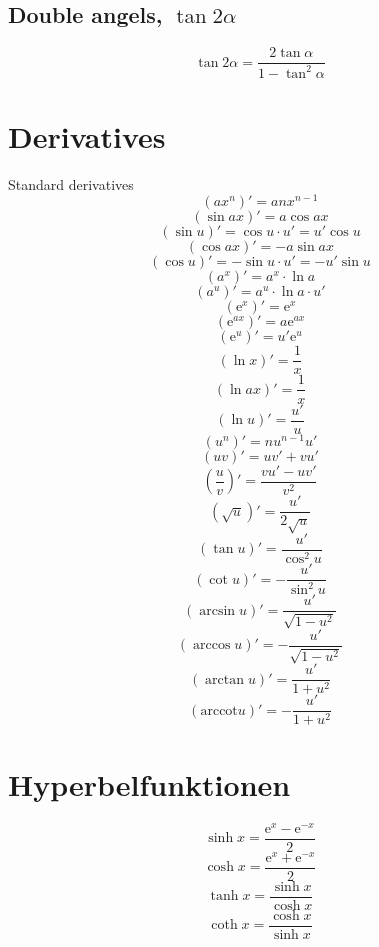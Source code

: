\documentclass[a4paper, 10pt]{scrartcl}
\newcommand*\euler{\mathrm{e}}
\newcommand*\arccot{\mathrm{arccot}}
\begin{document}
\subsection{Double angels, $\tan{2\alpha}$}
\[\tan{2\alpha} = \frac{2\tan{\alpha}}{1 - \tan^{2}{\alpha}}\]

\section{Derivatives}

Standard derivatives
\[(ax^{n})' = anx^{n-1}\]
\[(\sin{ax})' = a\cos{ax}\]
\[(\sin{u})' = \cos{u}\cdot u' = u'\cos{u}\]
\[(\cos{ax})' = -a\sin{ax}\]
\[(\cos{u})' = -\sin{u}\cdot u' = -u'\sin{u}\]
\[(a^{x})' = a^{x}\cdot\ln{a}\]
\[(a^{u})' = a^{u}\cdot\ln{a}\cdot u'\]
\[(\euler^{x})' = \euler^{x}\]
\[(\euler^{ax})' = a\euler^{ax}\]
\[(\euler^{u})' = u'\euler^{u}\]
\[(\ln{x})' = \frac{1}{x}\]
\[(\ln{ax})' = \frac{1}{x}\]
\[(\ln{u})' = \frac{u'}{u}\]
\[(u^{n})' = nu^{n-1}u'\]
\[(uv)' = uv' + vu'\]
\[\left(\frac{u}{v}\right)' = \frac{vu' - uv'}{v^{2}}\]
\[\left(\sqrt{u}\right)' = \frac{u'}{2\sqrt{u}}\]
\[(\tan{u})' = \frac{u'}{\cos^{2}{u}}\]
\[(\cot{u})' = -\frac{u'}{\sin^{2}{u}}\]
\[(\arcsin{u})' = \frac{u'}{\sqrt{1 - u^{2}}}\]
\[(\arccos{u})' = -\frac{u'}{\sqrt{1 - u^{2}}}\]
\[(\arctan{u})' = \frac{u'}{1 + u^{2}}\]
\[(\arccot{u})' = -\frac{u'}{1 + u^{2}}\]

\section{Hyperbelfunktionen}
\[\sinh{x} = \frac{\euler^{x} - \euler^{-x}}{2}\]
\[\cosh{x} = \frac{\euler^{x} + \euler^{-x}}{2}\]
\[\tanh{x} = \frac{\sinh{x}}{\cosh{x}}\]
\[\coth{x} = \frac{\cosh{x}}{\sinh{x}}\]
\end{document}
